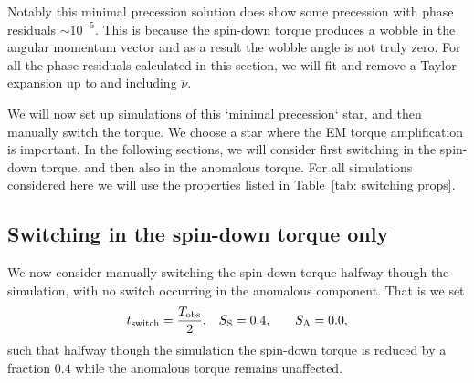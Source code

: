 \documentclass[../full_thesis/full_thesis.tex]{subfiles}
\begin{document}
Notably this minimal precession solution does show some precession with phase
residuals $\sim 10^{-5}$. This is because the spin-down torque produces a wobble
in the angular momentum vector and as a result the wobble angle is not truly
zero. For all the phase residuals calculated in this section, we will fit and
remove a Taylor expansion up to and including $\ddot{\nu}$.

We will now set up simulations of this `minimal precession` star, and then
manually switch the torque. We choose a star where the EM torque amplification is
important.  In the following sections, we will consider first switching in the
spin-down torque, and then also in the anomalous torque. For all simulations
considered here we will use the properties listed in Table~\ref{tab: switching
props}.

\subsection{Switching in the spin-down torque only}
We now consider manually switching the spin-down torque halfway though the
simulation, with no switch occurring in the anomalous component.
That is we set
\begin{align}
    t_{\mathrm{switch}} = \frac{T_{\mathrm{obs}}}{2}, &&& S_{\mathrm{S}} = 0.4, &&& S_{\mathrm{A}} = 0.0,
\label{eqn: SD only}
\end{align}
such that halfway though the simulation the spin-down torque is reduced by a
fraction $0.4$ while the anomalous torque remains unaffected.
\end{document}
